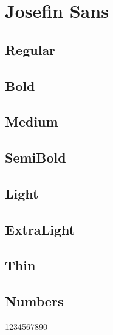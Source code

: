 \documentclass[11pt]{article}
\begin{document}
\section*{Josefin Sans}

\subsection*{Regular}
\lipsum[1]


\textit{\lipsum[2]}

\subsection*{Bold}

\textbf{\lipsum[3]}

\textbf{\textit{\lipsum[4]}}


\subsection*{Medium}

{\josefinmedium \lipsum[5]}

{\josefinmedium \textit{\lipsum[6]}}


\subsection*{SemiBold}
{\josefinsemibold \lipsum[8]}

{\josefinsemibold \textit{\lipsum[10]}}

\subsection*{Light}
{\josefinlight \lipsum[7]}

{\josefinlight \textit{\lipsum[9]}}

\subsection*{ExtraLight}

{\josefinextralight \lipsum[11]}

{\josefinextralight \textit{\lipsum[12]}}

\subsection*{Thin}
{\josefinthin \lipsum[13]}

{\josefinthin \textit{\lipsum[14]}}


\subsection*{Numbers}

1234567890
\end{document}
